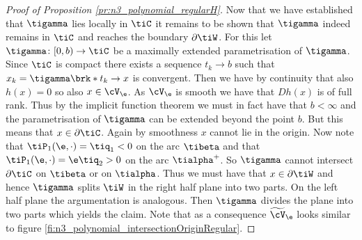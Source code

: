 \begin{proof}[Proof of Proposition \ref{pr:n3_polynomial_regularH}]
  Now that we have established that $\tigamma$ lies locally in $\tiC$ it remains to be shown that
  $\tigamma$ indeed remains in $\tiC$ and reaches the boundary $\partial \tiW$.
  For this let $\tigamma\colon [0,b)\to \tiC$ be a maximally extended parametrisation of $\tigamma$.
  Since $\tiC$ is compact there exists a sequence $t_k\to b$ such that $x_k=\tigamma\brk*{t_k}\to x$
  is convergent. Then we have by continuity that also $h(x)=0$ so also $x\in\cV_\e$.
  As $\cV_\e$ is smooth we have that $Dh(x)$ is of full rank. Thus by the implicit function theorem 
  we must in fact have that $b<\infty$ and the parametrisation of $\tigamma$ can be extended beyond
  the point $b$. But this means that $x\in\partial \tiC$.
  Again by smoothness $x$ cannot lie in the origin. 
  Now note that
  $\tiP_1(\e,\cdot)=\tiq_1<0$ on the arc $\tibeta$ and that
  $\tiP_1(\e,\cdot)=\e\tiq_2>0$ on the arc $\tialpha^+$.
  So $\tigamma$ cannot intersect $\partial \tiC$ on $\tibeta$ or on $\tialpha$.
  Thus we must have that $x\in\partial \tiW$ and hence $\tigamma$ splits $\tiW$ in the right half plane into two parts.
  On the left half plane the argumentation is analogous.
  Then $\tigamma$ divides the plane into two
  parts which yields the claim.
  Note that as a consequence $\widetilde{\cV}_\e$
  looks similar to figure \ref{fi:n3_polynomial_intersectionOriginRegular}.
\end{proof}

